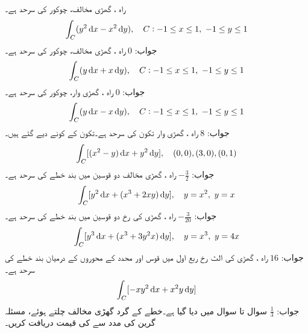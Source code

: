 \quad  راہ ،  گھڑی مخالف، چوکور کی سرحد  ہے۔\\
\begin{align*}
\int_C(y^2\dif x-x^2\dif y),\quad C:-1\le x\le 1,\,\, -1\le y\le 1
\end{align*}
جواب:\quad
$0$
\quad راہ ،  گھڑی مخالف، چوکور کی سرحد  ہے۔\\
\begin{align*}
\int_C(y\dif x+x\dif y),\quad C:-1\le x\le 1,\,\, -1\le y\le 1
\end{align*}
جواب:\quad
$0$
\quad راہ ،  گھڑی وار، چوکور کی سرحد  ہے۔\\
\begin{align*}
\int_C(y\dif x-x\dif y),\quad C:-1\le x\le 1,\,\, -1\le y\le 1
\end{align*}
جواب:\quad
$8$
\quad راہ ، گھڑی وار تکون کی سرحد ہے۔تکون کے کونے دیے گئے ہیں۔\\
\begin{align*}
\int_C[(x^2-y)\dif x+y^2\dif y],\quad (0,0),(3,0),(0,1)
\end{align*}
جواب:\quad
$-\tfrac{3}{2}$
\quad راہ ، گھڑی مخالف دو قوسین میں بند خطے کی سرحد ہے۔\\
\begin{align*}
\int_C [y^2\dif x+(x^3+2xy)\dif y],\quad y=x^2,\,\,y=x
\end{align*}
جواب:\quad
$-\tfrac{3}{20}$
\quad راہ ، گھڑی کی  رخ دو قوسین میں بند  خطے کی سرحد ہے۔\\
\begin{align*}
\int_C [y^3\dif x+(x^3+3y^2x)\dif y],\quad y=x^3,\,\,y=4x
\end{align*}
جواب:\quad
$16$
\quad راہ ، گھڑی کی  الٹ رخ ربع اول میں  قوس  اور محدد کے محوروں کے درمیان  بند خطے کی سرحد ہے۔\\
\begin{align*}
\int_C [-xy^2\dif x+x^2y\dif y]
\end{align*}
جواب:\quad
$\tfrac{1}{3}$
سوال  تا سوال  میں  دیا گیا ہے۔خطے کے گرد گھڑی مخالف چلتے ہوئے،  مسئلہ گرین کی مدد سے   کی قیمت دریافت  کریں۔

